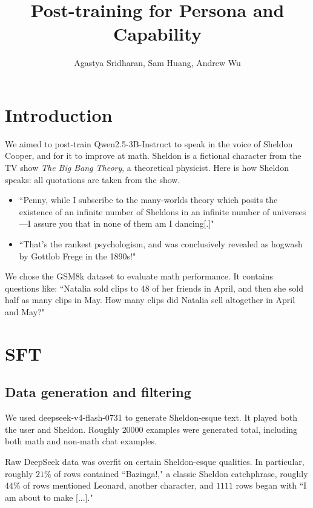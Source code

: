 \documentclass[9pt]{extarticle}
\begin{document}
\date{}

 
\title{Post-training for Persona and Capability}
\author{Agastya Sridharan, Sam Huang, Andrew Wu} 
 
\maketitle

\tableofcontents

\pagebreak

\section{Introduction}

We aimed to post-train Qwen2.5-3B-Instruct to speak in the voice of Sheldon Cooper, and for it to improve at math. Sheldon is a fictional character from the TV show \textit{The Big Bang Theory}, a theoretical physicist. Here is how Sheldon speaks: all quotations are taken from the show.
\begin{itemize}
    \item ``Penny, while I subscribe to the many-worlds theory which posits the existence of an infinite number of Sheldons in an infinite number of universes---I assure you that in none of them am I dancing[.]"
    \item ``That’s the rankest psychologism, and was conclusively revealed as hogwash by Gottlob Frege in the 1890s!"
\end{itemize}

We chose the GSM8k dataset to evaluate math performance. It contains questions like: ``Natalia sold clips to 48 of her friends in April, and then she sold half as many clips in May. How many clips did Natalia sell altogether in April and May?"

\section{SFT}

\subsection{Data generation and filtering}

We used deepseek-v4-flash-0731 to generate Sheldon-esque text. It played both the user and Sheldon. Roughly $20000$ examples were generated total, including both math and non-math chat examples.

Raw DeepSeek data was overfit on certain Sheldon-esque qualities. In particular, roughly $21\%$ of rows contained ``Bazinga!," a classic Sheldon catchphrase, roughly $44\%$ of rows mentioned Leonard, another character, and $1111$ rows began with ``I am about to make [...]."
\end{document}
